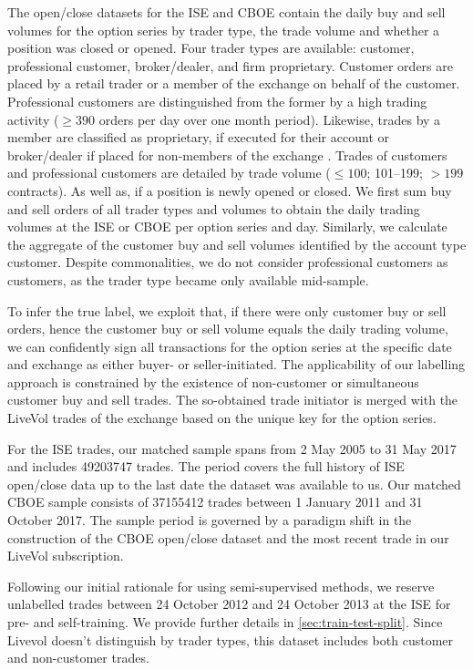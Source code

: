 The open/close datasets for the \gls{ISE} and \gls{CBOE} contain the daily buy and sell volumes for the option series by trader type, the trade volume and whether a position was closed or opened. Four trader types are available: customer, professional customer, broker/dealer, and firm proprietary. Customer orders are placed by a retail trader or a member of the exchange on behalf of the customer. Professional customers are distinguished from the former by a high trading activity ($\geq390$ orders per day over one month period). Likewise, trades by a member are classified as proprietary, if executed for their account or broker/dealer if placed for non-members of the exchange \autocite[][2]{nasdaqincFrequentlyAskedQuestions2017}. Trades of customers and professional customers are detailed by trade volume ($\leq 100$; 101--199; $> 199$ contracts). As well as, if a position is newly opened or closed. We first sum buy and sell orders of all trader types and volumes to obtain the daily trading volumes at the \gls{ISE} or \gls{CBOE} per option series and day. Similarly, we calculate the aggregate of the customer buy and sell volumes identified by the account type customer. Despite commonalities, we do not consider professional customers as customers, as the trader type became only available mid-sample.

To infer the true label, we exploit that, if there were only customer buy or sell orders, hence the customer buy or sell volume equals the daily trading volume, we can confidently sign all transactions for the option series at the specific date and exchange as either buyer- or seller-initiated. The applicability of our labelling approach is constrained by the existence of non-customer or simultaneous customer buy and sell trades. The so-obtained trade initiator is merged with the LiveVol trades of the exchange based on the unique key for the option series.

For the \gls{ISE} trades, our matched sample spans from 2 May 2005 to 31 May 2017 and includes \num{49203747} trades. The period covers the full history of \gls{ISE} open/close data up to the last date the dataset was available to us. Our matched \gls{CBOE} sample consists of \num{37155412} trades between 1 January 2011 and 31 October 2017. The sample period is governed by a paradigm shift in the construction of the \gls{CBOE} open/close dataset and the most recent trade in our LiveVol subscription.

Following our initial rationale for using semi-supervised methods, we reserve unlabelled trades between 24 October 2012 and 24 October 2013 at the \gls{ISE} for pre- and self-training. We provide further details in \cref{sec:train-test-split}. Since Livevol doesn't distinguish by trader types, this dataset includes both customer and non-customer trades.

